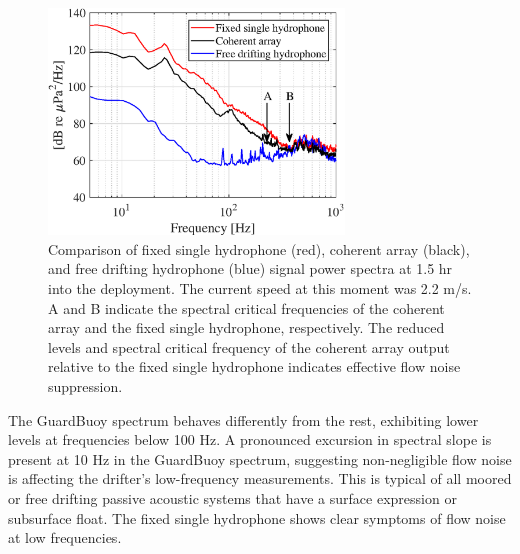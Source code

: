\documentclass[12pt,journal,onecolumn]{IEEEtran}
\begin{document}
\begin{figure}[!t]
	\begin{center}
		\includegraphics[width=0.7\textwidth]{figure8.eps} %
	\end{center}
	\caption[Comparison of hydrophone, coherent array, and guard buoy signals]{
	\label{f:comparison}
	Comparison of fixed single hydrophone (red), coherent array (black), and free drifting hydrophone (blue) signal power spectra at 1.5 hr into the deployment. The current speed at this moment was 2.2 m/s. A and B indicate the spectral critical frequencies of the coherent array and the fixed single hydrophone, respectively. The reduced levels and spectral critical frequency of the coherent array output relative to the fixed single hydrophone indicates effective flow noise suppression.  }
\end{figure}

The GuardBuoy spectrum behaves differently from the rest, exhibiting lower levels at frequencies below 100 Hz. A pronounced excursion in spectral slope is present at 10 Hz in the GuardBuoy spectrum, suggesting non-negligible flow noise is affecting the drifter's low-frequency measurements. This is typical of all moored or free drifting passive acoustic systems that have a surface expression or subsurface float. The fixed single hydrophone shows clear symptoms of flow noise at low frequencies. 
\end{document}
